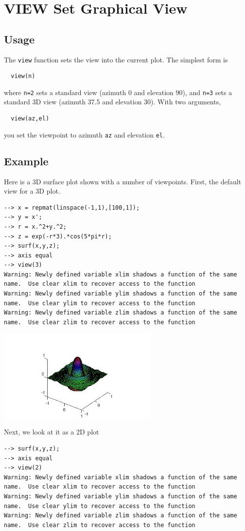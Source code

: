 \section{VIEW Set Graphical View}

\subsection{Usage}

The \verb|view| function sets the view into the current plot.
The simplest form is
\begin{verbatim}
  view(n)
\end{verbatim}
where \verb|n=2| sets a standard view (azimuth 0 and elevation 90),
and \verb|n=3| sets a standard 3D view (azimuth 37.5 and elevation 30).
With two arguments,
\begin{verbatim}
  view(az,el)
\end{verbatim}
you set the viewpoint to azimuth \verb|az| and elevation \verb|el|.
\subsection{Example}

Here is a 3D surface plot shown with a number of viewpoints.
First, the default view for a 3D plot.
\begin{verbatim}
--> x = repmat(linspace(-1,1),[100,1]);
--> y = x';
--> r = x.^2+y.^2;
--> z = exp(-r*3).*cos(5*pi*r);
--> surf(x,y,z);
--> axis equal
--> view(3)
Warning: Newly defined variable xlim shadows a function of the same name.  Use clear xlim to recover access to the function
Warning: Newly defined variable ylim shadows a function of the same name.  Use clear ylim to recover access to the function
Warning: Newly defined variable zlim shadows a function of the same name.  Use clear zlim to recover access to the function
\end{verbatim}


\centerline{\includegraphics[width=8cm]{view1}}

Next, we look at it as a 2D plot
\begin{verbatim}
--> surf(x,y,z);
--> axis equal
--> view(2)
Warning: Newly defined variable xlim shadows a function of the same name.  Use clear xlim to recover access to the function
Warning: Newly defined variable ylim shadows a function of the same name.  Use clear ylim to recover access to the function
Warning: Newly defined variable zlim shadows a function of the same name.  Use clear zlim to recover access to the function
\end{verbatim}


